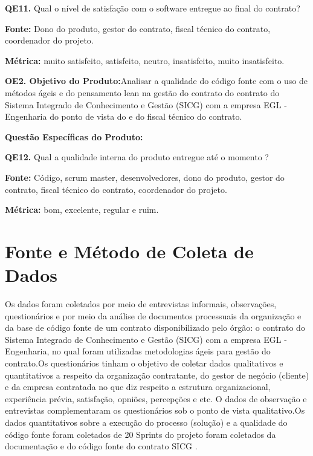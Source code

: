  \vspace{\onelineskip} 

\textbf{QE11.} Qual o nível de satisfação com o software entregue ao final do contrato?

\textbf{Fonte:} Dono do produto, gestor do contrato, fiscal técnico do contrato, coordenador do projeto.

\textbf{Métrica:} muito satisfeito, satisfeito, neutro, insatisfeito, muito insatisfeito.
 
 \vspace{\onelineskip} 

\textbf{OE2. Objetivo do Produto:}Analisar a qualidade do código fonte com o uso de métodos ágeis e do pensamento lean na gestão do contrato do contrato do Sistema Integrado 
de Conhecimento e Gestão (SICG) com a empresa EGL - Engenharia do ponto de vista do  e do fiscal técnico do contrato.

\textbf{Questão Específicas do Produto:}

\textbf{QE12.} Qual a qualidade interna do produto entregue até o momento ?

\textbf{Fonte:} Código, scrum master, desenvolvedores, dono do produto, gestor do contrato, fiscal técnico do contrato, coordenador do projeto.

\textbf{Métrica:} bom, excelente, regular e ruim.


\section[Fonte e Método Coleta de Dados]{Fonte e Método de Coleta de Dados}

Os dados foram coletados por meio de entrevistas informais, observações, questionários e por meio da análise de documentos processuais da organização e da base de código fonte de um contrato disponibilizado pelo órgão: o contrato do Sistema Integrado de Conhecimento e Gestão (SICG) com a empresa EGL - Engenharia, no qual foram utilizadas metodologias ágeis para gestão do contrato.Os questionários tinham o objetivo de coletar dados qualitativos e
quantitativos a respeito da organização contratante, do gestor de negócio (cliente) e da empresa contratada no que diz respeito a estrutura organizacional, experiência prévia, satisfação, opniões, percepções e etc. O dados de observação e entrevistas
complementaram os questionários sob o ponto de vista qualitativo.Os dados quantitativos
sobre a execução do processo (solução) e a qualidade do código fonte foram coletados de 20 Sprints do projeto foram coletados da documentação e do código fonte do contrato SICG .

